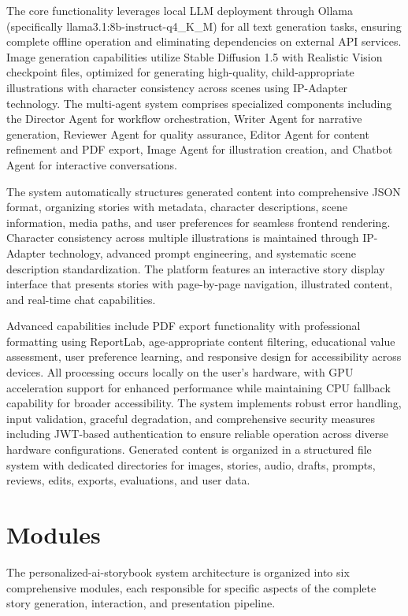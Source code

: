 The core functionality leverages local LLM deployment through Ollama (specifically llama3.1:8b-instruct-q4\_K\_M) for all text generation tasks, ensuring complete offline operation and eliminating dependencies on external API services. Image generation capabilities utilize Stable Diffusion 1.5 with Realistic Vision checkpoint files, optimized for generating high-quality, child-appropriate illustrations with character consistency across scenes using IP-Adapter technology. The multi-agent system comprises specialized components including the Director Agent for workflow orchestration, Writer Agent for narrative generation, Reviewer Agent for quality assurance, Editor Agent for content refinement and PDF export, Image Agent for illustration creation, and Chatbot Agent for interactive conversations.

The system automatically structures generated content into comprehensive JSON format, organizing stories with metadata, character descriptions, scene information, media paths, and user preferences for seamless frontend rendering. Character consistency across multiple illustrations is maintained through IP-Adapter technology, advanced prompt engineering, and systematic scene description standardization. The platform features an interactive story display interface that presents stories with page-by-page navigation, illustrated content, and real-time chat capabilities.

Advanced capabilities include PDF export functionality with professional formatting using ReportLab, age-appropriate content filtering, educational value assessment, user preference learning, and responsive design for accessibility across devices. All processing occurs locally on the user's hardware, with GPU acceleration support for enhanced performance while maintaining CPU fallback capability for broader accessibility. The system implements robust error handling, input validation, graceful degradation, and comprehensive security measures including JWT-based authentication to ensure reliable operation across diverse hardware configurations. Generated content is organized in a structured file system with dedicated directories for images, stories, audio, drafts, prompts, reviews, edits, exports, evaluations, and user data.

\section{Modules}

The personalized-ai-storybook system architecture is organized into six comprehensive modules, each responsible for specific aspects of the complete story generation, interaction, and presentation pipeline.

